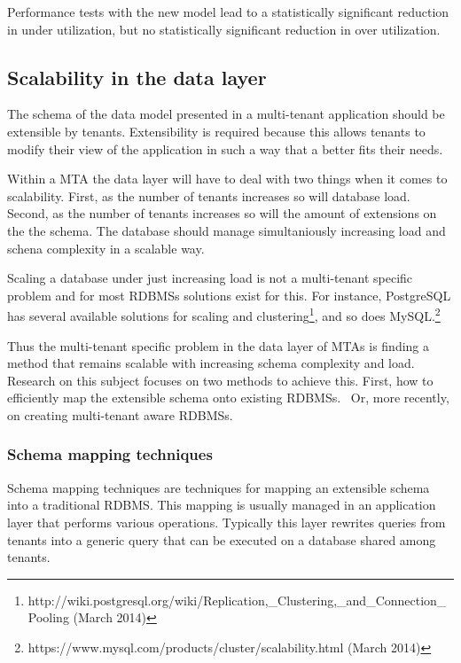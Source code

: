 Performance tests with the new model lead to a statistically significant reduction in under utilization, but no statistically significant reduction in over utilization.


\subsection{Scalability in the data layer}
The schema of the data model presented in a multi-tenant application should be extensible by tenants.
Extensibility is required because this allows tenants to modify their view of the application in such a way that a better fits their needs.

Within a \ac{MTA} the data layer will have to deal with two things when it comes to scalability.
First, as the number of tenants increases so will database load.
Second, as the number of tenants increases so will the amount of extensions on the the schema.
The database should  manage simultaniously increasing load and schena complexity in a scalable way.

Scaling a database under just increasing load is not a multi-tenant specific problem and for most \acp{RDBMS} solutions exist for this. 
For instance, PostgreSQL has several available solutions for scaling and clustering\footnote{http://wiki.postgresql.org/wiki/Replication,\_Clustering,\_and\_Connection\_Pooling (March 2014)}, and so does MySQL.\footnote{https://www.mysql.com/products/cluster/scalability.html (March 2014)}

Thus the multi-tenant specific problem in the data layer of \acp{MTA} is finding a method that remains scalable with increasing schema complexity and load.
Research on this subject focuses on two methods to achieve this.
First, how to efficiently map the extensible schema onto existing \acp{RDBMS}.~\cite{aulbach2008multi, aulbach2009comparison} 
Or, more recently, on creating multi-tenant aware \acp{RDBMS}.~\cite{schiller2011native, aulbach2011extensibility} 

\subsubsection{Schema mapping techniques}
Schema mapping techniques are techniques for mapping an extensible schema into a traditional \ac{RDBMS}.
This mapping is usually managed in an application layer that performs various operations. 
Typically this layer rewrites queries from tenants into a generic query that can be executed on a database shared among tenants.

